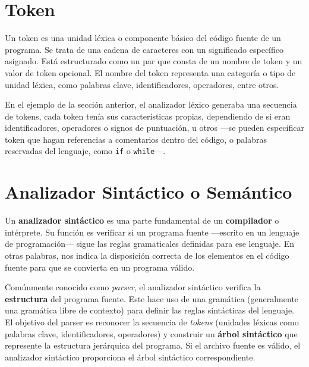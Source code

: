 \lstset{inputencoding=utf8/latin1}


\section{Token}
\noindent Un token es una unidad léxica o componente básico del código fuente de un programa. Se trata de una cadena de caracteres con un significado específico asignado. Está estructurado como un par que consta de un nombre de token y un valor de token opcional. El nombre del token representa una categoría o tipo de unidad léxica, como palabras clave, identificadores, operadores, entre otros\cite{token}.

En el ejemplo de la sección anterior, el analizador léxico generaba una secuencia de tokens, cada token tenía sus características propias, dependiendo de si eran identificadores, operadores o signos de puntuación, u otros ---se pueden especificar token que hagan referencias a comentarios dentro del código, o palabras reservadas del lenguaje, como \lstinline[keywordstyle=\color{black}]|if| o \lstinline[keywordstyle=\color{black}]|while|---.


\section{Analizador Sintáctico o Semántico}
\noindent Un \textbf{analizador sintáctico} es una parte fundamental de un \textbf{compilador} o intérprete. Su función es verificar si un programa fuente ---escrito en un lenguaje de programación--- sigue las reglas gramaticales definidas para ese lenguaje\cite{analizadorsintactico}. En otras palabras, nos indica la disposición correcta de los elementos en el código fuente para que se convierta en un programa válido.

Comúnmente conocido como \textit{parser}, el analizador sintáctico verifica la \textbf{estructura} del programa fuente. Este hace uso de una gramática (generalmente una gramática libre de contexto) para definir las reglas sintácticas del lenguaje. El objetivo del parser es reconocer la secuencia de \textit{tokens} (unidades léxicas como palabras clave, identificadores, operadores) y construir un \textbf{árbol sintáctico} que represente la estructura jerárquica del programa. Si el archivo fuente es válido, el analizador sintáctico proporciona el árbol sintáctico correspondiente.

